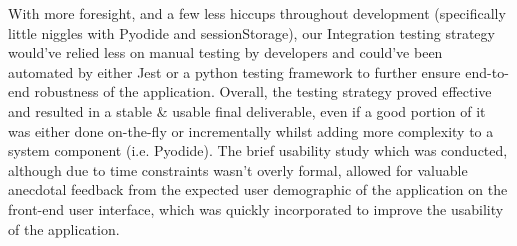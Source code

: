 With more foresight, and a few less hiccups throughout development (specifically little niggles with Pyodide and sessionStorage), our Integration testing strategy would've relied less on manual testing by developers and could've been automated by either Jest or a python testing framework to further ensure end-to-end robustness of the application. Overall, the testing strategy proved effective and resulted in a stable \& usable final deliverable, even if a good portion of it was either done on-the-fly or incrementally whilst adding more complexity to a system component (i.e. Pyodide). The brief usability study which was conducted, although due to time constraints wasn't overly formal, allowed for valuable anecdotal feedback from the expected user demographic of the application on the front-end user interface, which was quickly incorporated to improve the usability of the application.  